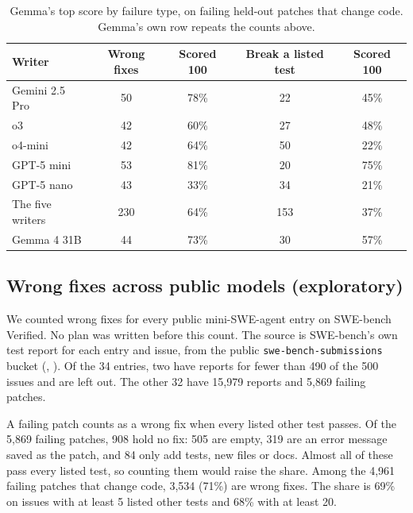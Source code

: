 \documentclass[10pt,letterpaper]{article}
\begin{document}
\begin{table}[H]
\centering
\small
\caption{Gemma's top score by failure type, on failing held-out patches that change code. Gemma's own row repeats the
counts above.}
\label{tab:typewriters}
\begin{tabular}{@{}lcccc@{}}
\toprule
Writer & Wrong fixes & Scored 100 & Break a listed test & Scored 100 \\
\midrule
Gemini 2.5 Pro & 50 & 78\% & 22 & 45\% \\
o3 & 42 & 60\% & 27 & 48\% \\
o4-mini & 42 & 64\% & 50 & 22\% \\
GPT-5 mini & 53 & 81\% & 20 & 75\% \\
GPT-5 nano & 43 & 33\% & 34 & 21\% \\
\midrule
The five writers & 230 & 64\% & 153 & 37\% \\
Gemma 4 31B & 44 & 73\% & 30 & 57\% \\
\bottomrule
\end{tabular}
\end{table}

\subsection*{Wrong fixes across public models (exploratory)}

We counted wrong fixes for every public mini-SWE-agent entry on SWE-bench Verified. No plan was written before this
count. The source is SWE-bench's own test report for each entry and issue, from the public
\texttt{swe-bench-submissions} bucket (,
). Of the 34 entries, two have reports for fewer than
490 of the 500 issues and are left out. The other 32 have 15,979 reports and 5,869 failing patches.

A failing patch counts as a wrong fix when every listed other test passes. Of the 5,869 failing patches, 908 hold no
fix: 505 are empty, 319 are an error message saved as the patch, and 84 only add tests, new files or docs. Almost all
of these pass every listed test, so counting them would raise the share. Among the 4,961 failing patches that change
code, 3,534 (71\%) are wrong fixes. The share is 69\% on issues with at least 5 listed other tests and 68\% with at
least 20.
\end{document}

